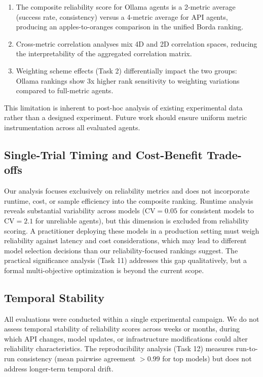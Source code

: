 \begin{enumerate}
    \item The composite reliability score for Ollama agents is a 2-metric average (success rate, consistency) versus a 4-metric average for API agents, producing an apples-to-oranges comparison in the unified Borda ranking.
    \item Cross-metric correlation analyses mix 4D and 2D correlation spaces, reducing the interpretability of the aggregated correlation matrix.
    \item Weighting scheme effects (Task 2) differentially impact the two groups: Ollama rankings show 3x higher rank sensitivity to weighting variations compared to full-metric agents.
\end{enumerate}

This limitation is inherent to post-hoc analysis of existing experimental data rather than a designed experiment. Future work should ensure uniform metric instrumentation across all evaluated agents.

\subsection{Single-Trial Timing and Cost-Benefit Trade-offs}

Our analysis focuses exclusively on reliability metrics and does not incorporate runtime, cost, or sample efficiency into the composite ranking. Runtime analysis reveals substantial variability across models ($\text{CV} = 0.05$ for consistent models to $\text{CV} = 2.1$ for unreliable agents), but this dimension is excluded from reliability scoring. A practitioner deploying these models in a production setting must weigh reliability against latency and cost considerations, which may lead to different model selection decisions than our reliability-focused rankings suggest. The practical significance analysis (Task 11) addresses this gap qualitatively, but a formal multi-objective optimization is beyond the current scope.

\subsection{Temporal Stability}

All evaluations were conducted within a single experimental campaign. We do not assess temporal stability of reliability scores across weeks or months, during which API changes, model updates, or infrastructure modifications could alter reliability characteristics. The reproducibility analysis (Task 12) measures run-to-run consistency (mean pairwise agreement $> 0.99$ for top models) but does not address longer-term temporal drift.

